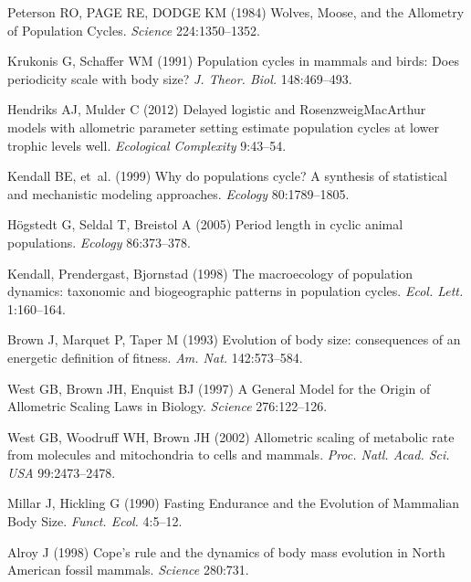 \documentclass{pnastwo}
\begin{document}
\begin{article}
\begin{thebibliography}{10}
Peterson RO, PAGE RE, DODGE KM
\newblock (1984) {Wolves, Moose, and the Allometry of Population Cycles}.
\newblock \emph{Science} 224:1350--1352.

Krukonis G, Schaffer WM
\newblock (1991) {Population cycles in mammals and birds: Does periodicity
  scale with body size?}
\newblock \emph{J. Theor. Biol.} 148:469--493.

Hendriks AJ, Mulder C
\newblock (2012) {Delayed logistic and Rosenzweig{\textendash}MacArthur models
  with allometric parameter setting estimate population cycles at lower trophic
  levels well}.
\newblock \emph{Ecological Complexity} 9:43--54.

Kendall BE, {et~al.}
\newblock (1999) {Why do populations cycle? A synthesis of statistical and
  mechanistic modeling approaches}.
\newblock \emph{Ecology} 80:1789--1805.

H{\"o}gstedt G, Seldal T, Breistol A
\newblock (2005) {Period length in cyclic animal populations}.
\newblock \emph{Ecology} 86:373--378.

Kendall, Prendergast, Bjornstad
\newblock (1998) {The macroecology of population dynamics: taxonomic and
  biogeographic patterns in population cycles}.
\newblock \emph{Ecol. Lett.} 1:160--164.

Brown J, Marquet P, Taper M
\newblock (1993) {Evolution of body size: consequences of an energetic
  definition of fitness}.
\newblock \emph{Am. Nat.} 142:573--584.

West GB, Brown JH, Enquist BJ
\newblock (1997) {A General Model for the Origin of Allometric Scaling Laws in
  Biology}.
\newblock \emph{Science} 276:122--126.

West GB, Woodruff WH, Brown JH
\newblock (2002) {Allometric scaling of metabolic rate from molecules and
  mitochondria to cells and mammals}.
\newblock \emph{Proc. Natl. Acad. Sci. USA} 99:2473--2478.

Millar J, Hickling G
\newblock (1990) { Fasting Endurance and the Evolution of Mammalian Body Size}.
\newblock \emph{Funct. Ecol.} 4:5--12.

Alroy J
\newblock (1998) {Cope's rule and the dynamics of body mass evolution in North
  American fossil mammals}.
\newblock \emph{Science} 280:731.


\end{thebibliography}
\end{article}
\end{document}
